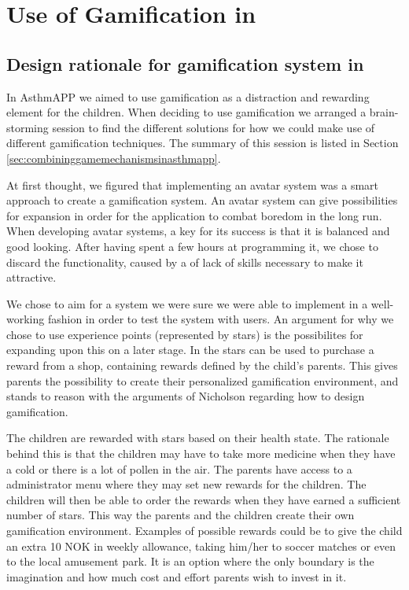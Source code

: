 \section{Use of Gamification in \app{}}
\label{sec:useofgamificationinapp}

\subsection{Design rationale for gamification system in \app{}}
\label{sec:designrationalegamification}
In AsthmAPP we aimed to use gamification as a distraction and rewarding element for the children. When deciding to use gamification we arranged a brain-storming session to find the different solutions for how we could make use of different gamification techniques. The summary of this session is listed in Section \ref{sec:combininggamemechanismsinasthmapp}. 

At first thought, we figured that implementing an avatar system was a smart approach to create a gamification system. An avatar system can give possibilities for expansion in order for the application to combat boredom in the long run. When developing avatar systems, a key for its success is that it is balanced and good looking. After having spent a few hours at programming it, we chose to discard the functionality, caused by a of lack of skills necessary to make it attractive. 

We chose to aim for a system we were sure we were able to implement in a well-working fashion in order to test the system with users. An argument for why we chose to use experience points (represented by stars) is the possibilites for expanding upon this on a later stage. In \app{} the stars can be used to purchase a reward from a shop, containing rewards defined by the child's parents. This gives parents the possibility to create their personalized gamification environment, and stands to reason with the arguments of Nicholson regarding how to design gamification\cite{nicholson2012user}.

The children are rewarded with stars based on their health state. The rationale behind this is that the children may have to take more medicine when they have a cold or there is a lot of pollen in the air. The parents have access to a administrator menu where they may set new rewards for the children. The children will then be able to order the rewards when they have earned a sufficient number of stars. This way the parents and the children create their own gamification environment. Examples of possible rewards could be to give the child an extra 10 NOK in weekly allowance, taking him/her to soccer matches or even to the local amusement park. It is an option where the only boundary is the imagination and how much cost and effort parents wish to invest in it.    

